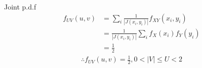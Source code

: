 \documentclass{beamer}
\begin{document}
\begin{frame}{Joint p.d.f}
\begin{align}
    f_{UV}(u,v) &= \sum_{i}^{} \frac{1}{|J(x_i,y_i)|} f_{XY}(x_i, y_i)\\
    &= \frac{1}{|J(x_i,y_i)|}  \sum_{i}^{} f_X(x_i) f_Y(y_i)\\
    &= \frac{1}{2}
\end{align}
\begin{align}
  \therefore f_{UV}(u,v) = \frac{1}{2} ,  0 < |V| \leq U < 2
\end{align}
    
\end{frame}
\end{document}
